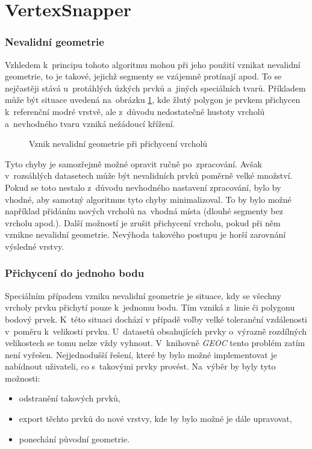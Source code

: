 \section{VertexSnapper}
\label{problemy-vs}

\subsubsection{Nevalidní geometrie}
Vzhledem k~principu tohoto algoritmu mohou při jeho použití vznikat nevalidní 
geometrie, to je takové, jejichž segmenty se vzájemně protínají apod. 
To se nejčastěji stává u~protáhlých úzkých prvků a~jiných speciálních tvarů. 
Příkladem může být situace uvedená na~obrázku \ref{fig:vs-nevalidni}, 
kde žlutý polygon je prvkem přichycen k~referenční modré vrstvě, 
ale z~důvodu nedostatečné hustoty vrcholů a~nevhodného tvaru vzniká nežádoucí 
křížení.

\label{vsinvalid}
  \begin{figure}[hbt]
    \centering
      
      \caption{Vznik nevalidní geometrie při přichycení vrcholů}
      \label{fig:vs-nevalidni}
  \end{figure} 

Tyto chyby je samozřejmě možné opravit ručně po~zpracování. Avšak
v~rozsáhlých datasetech může být nevalidních prvků poměrně velké množství.
Pokud se toto nestalo z~důvodu nevhodného nastavení zpracování, bylo by 
vhodné, aby samotný algoritmus tyto chyby minimalizoval. To by bylo možné 
například přidáním nových vrcholů na~vhodná místa (dlouhé segmenty bez vrcholu
apod.). Další možností je zrušit přichycení vrcholu, pokud při něm vznikne
nevalidní geometrie. Nevýhoda takového postupu je horší zarovnání výsledné 
vrstvy. 

\subsubsection{Přichycení do jednoho bodu}
Speciálním případem vzniku nevalidní geometrie je situace, kdy se všechny 
vrcholy prvku přichytí pouze k~jednomu bodu. Tím vzniká z~linie či polygonu
bodový prvek. K~této situaci dochází v případě volby velké toleranční 
vzdálenosti v~poměru k~velikosti prvku. U~datasetů obsahujících prvky
o~výrazně rozdílných velikostech se tomu nelze vždy vyhnout. V~knihovně
\textit{GEOC} tento problém zatím není vyřešen. Nejjednodušší řešení, které
by bylo možné implementovat je nabídnout uživateli, co s~takovými prvky provést.
Na~výběr by byly tyto možnosti:
\begin{itemize}
 \item odstranění takových prvků,
 \item export těchto prvků do nové vrstvy, kde by bylo možné je dále upravovat,
 \item ponechání původní geometrie. 
\end{itemize}


